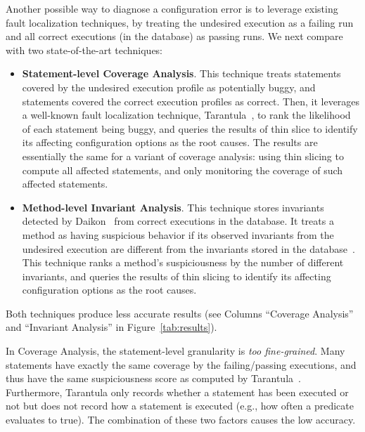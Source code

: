 

Another possible way to diagnose a configuration error is to leverage
existing fault localization techniques, by treating the undesired
execution as a failing run and all correct executions (in the database)
as passing runs. We next compare \ourtool with two state-of-the-art
techniques: %

\begin{itemize}
\item \textbf{Statement-level Coverage Analysis}. This technique treats statements covered
by the undesired execution profile as potentially buggy, and statements
covered the correct execution profiles as correct.
Then, it leverages a well-known fault localization technique,
Tarantula~\cite{Jones:2002}, to rank the likelihood of each
statement being buggy, and queries the results of thin slice
to identify its affecting configuration options as the root causes.
The results are essentially the same for a variant of
coverage analysis: using thin slicing to compute all affected statements,
and only monitoring the coverage of such affected statements.

\item \textbf{Method-level Invariant Analysis}. This technique stores invariants detected
by Daikon~\cite{Ernst:1999} from correct executions in the database.
It treats a method as having suspicious behavior if its observed invariants
from the undesired execution are different from the invariants stored
in the database~\cite{McCamant:2003}. This technique ranks a method's suspiciousness by
the number of different invariants, and queries the results of thin slicing
to identify its affecting configuration options as the root causes. 
\end{itemize}


Both techniques produce less accurate results (see Columns
``Coverage Analysis'' and ``Invariant Analysis'' in Figure~\ref{tab:results}).

In Coverage Analysis, the statement-level granularity is \textit{too fine-grained}.
Many statements have exactly the same coverage by the failing/passing executions,
and thus have the same suspiciousness score as computed by Tarantula~\cite{Jones:2002}.
Furthermore, Tarantula only records whether a
statement has been executed or not but does not record how a statement is 
executed (e.g., how often a predicate evaluates to true). The combination
of these two factors causes the low accuracy.


